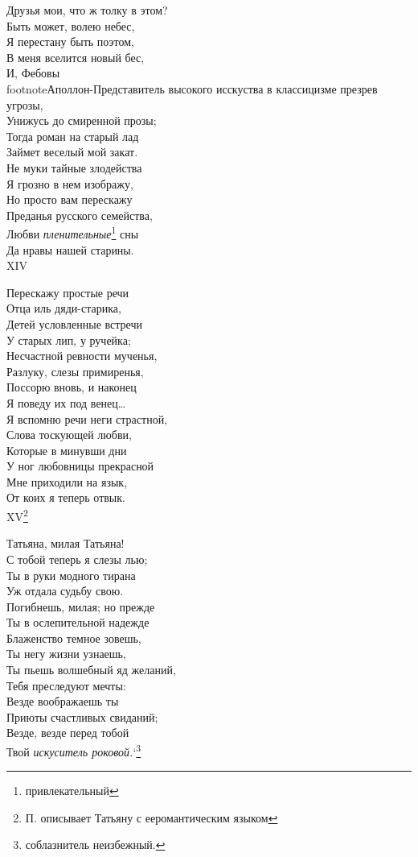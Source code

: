 Друзья мои, что ж толку в этом?\\
Быть может, волею небес,\\
Я перестану быть поэтом,\\
В меня вселится новый бес,\\
И, Фебовы\\footnote{Аполлон-Представитель высокого исскуства в классицизме} презрев угрозы,\\
Унижусь до смиренной прозы;\\
Тогда роман на старый лад\\
Займет веселый мой закат.\\
Не муки тайные злодейства\\
Я грозно в нем изображу,\\
Но просто вам перескажу\\
Преданья русского семейства,\\
Любви \emph{пленительные}\footnote{привлекательный} сны\\
Да нравы нашей старины.\\

XIV

Перескажу простые речи\\
Отца иль дяди-старика,\\
Детей условленные встречи\\
У старых лип, у ручейка;\\
Несчастной ревности мученья,\\
Разлуку, слезы примиренья,\\
Поссорю вновь, и наконец\\
Я поведу их под венец…\\
Я вспомню речи неги страстной,\\
Слова тоскующей любви,\\
Которые в минувши дни\\
У ног любовницы прекрасной\\
Мне приходили на язык,\\
От коих я теперь отвык.\\

XV\footnote{П. описывает Татьяну с ееромантическим языком}

Татьяна, милая Татьяна!\\
С тобой теперь я слезы лью;\\
Ты в руки модного тирана\\
Уж отдала судьбу свою.\\
Погибнешь, милая; но прежде\\
Ты в ослепительной надежде\\
Блаженство темное зовешь,\\
Ты негу жизни узнаешь,\\
Ты пьешь волшебный яд желаний,\\
Тебя преследуют мечты:\\
Везде воображаешь ты\\
Приюты счастливых свиданий;\\
Везде, везде перед тобой\\
Твой \emph{искуситель роковой.}`\footnote{соблазнитель неизбежный.}\\

